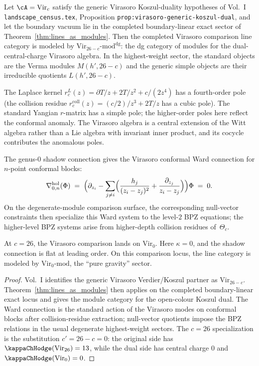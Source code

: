 \begin{theorem}
\label{comp:line-op-virasoro}
Let $\cA=\mathrm{Vir}_c$ satisfy the generic Virasoro Koszul-duality
hypotheses of Vol.~I \texttt{landscape\_census.tex}, Proposition
\texttt{prop:virasoro-generic-koszul-dual},
and let the boundary vacuum lie in the completed boundary-linear exact
sector of Theorem~\ref{thm:lines_as_modules}. Then the completed
Virasoro comparison line category is modeled by
$\mathrm{Vir}_{26-c}\text{-mod}^{\mathrm{dg}}$:
the dg category of modules for the dual-central-charge
Virasoro algebra. In the highest-weight sector, the standard objects
are the Verma modules $M(h',26-c)$ and the generic simple objects are
their irreducible quotients $L(h',26-c)$.

The Laplace kernel $r^L_c(z)=\partial T/z+2T/z^2+c/(2z^4)$ has a
fourth-order pole (the collision residue $r^{\mathrm{coll}}_c(z) =
(c/2)/z^3 + 2T/z$ has a cubic pole). The standard Yangian
$r$-matrix has a simple pole; the higher-order poles here reflect
the conformal anomaly. The Virasoro algebra is a central extension
of the Witt algebra rather than a Lie algebra with invariant inner
product, and its cocycle contributes the anomalous poles.

The genus-$0$ shadow connection gives the
Virasoro conformal Ward connection for $n$-point conformal blocks:
\[
\nabla^{\mathrm{hol}}_{0,n}(\Phi)
\;=\;
\Bigl(
\partial_{z_i}
-\sum_{j\neq i}
\Bigl(\frac{h_j}{(z_i-z_j)^2}
+\frac{\partial_{z_j}}{z_i-z_j}\Bigr)
\Bigr)\Phi
\;=\;0.
\]
On the degenerate-module comparison surface, the corresponding
null-vector constraints then specialize this Ward system to the
level-$2$ BPZ equations; the higher-level BPZ systems arise from
higher-depth collision residues of~$\Theta_c$.

At $c=26$, the Virasoro comparison lands on
$\mathrm{Vir}_0$. Here $\kappa=0$, and the shadow
connection is flat at leading order. On this comparison locus,
the line category is modeled by $\mathrm{Vir}_0\text{-mod}$,
the ``pure gravity'' sector.
\end{theorem}

\begin{proof}
Vol.~I identifies the generic Virasoro Verdier/Koszul partner as
$\mathrm{Vir}_{26-c}$. Theorem~\ref{thm:lines_as_modules} then applies
on the completed boundary-linear exact locus and gives the module
category for the open-colour Koszul dual. The Ward connection is the
standard action of the Virasoro modes on conformal blocks after
collision-residue extraction; null-vector quotients impose the BPZ
relations in the usual degenerate highest-weight sectors. The
$c=26$ specialization is the substitution $c'=26-c=0$:
the original side has $\kappaChHodge(\mathrm{Vir}_{26})=13$, while the dual
side has central charge $0$ and
$\kappaChHodge(\mathrm{Vir}_{0})=0$.
\end{proof}

